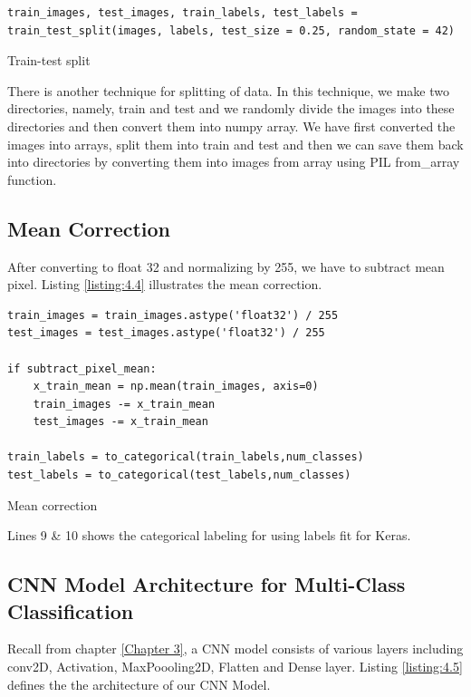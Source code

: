 \begin{listing}[H]
    \begin{verbatim}
train_images, test_images, train_labels, test_labels = 
train_test_split(images, labels, test_size = 0.25, random_state = 42)
\end{verbatim}
\caption{Train-test split}
\label{listing:4.3}
\end{listing}
There is another technique for splitting of data. In this technique, we make two directories,
namely, train and test and we randomly divide the images into these directories and then
convert them into numpy array. We have first converted the images
into arrays, split them into train and test and then we can save them back into
directories by converting them into images from array using PIL from\_array
function.

\subsection{Mean Correction}
After converting to float 32 and normalizing by 255, we have to subtract mean pixel.
Listing \ref{listing:4.4} illustrates the mean correction.

\begin{listing}[H]
    \begin{verbatim}
train_images = train_images.astype('float32') / 255
test_images = test_images.astype('float32') / 255

if subtract_pixel_mean:
    x_train_mean = np.mean(train_images, axis=0)
    train_images -= x_train_mean
    test_images -= x_train_mean

train_labels = to_categorical(train_labels,num_classes)
test_labels = to_categorical(test_labels,num_classes)
    \end{verbatim}
    \caption{Mean correction}
\label{listing:4.4}
\end{listing}
\noindent Lines 9 \& 10 shows the categorical labeling for using labels fit for Keras.
\subsection{CNN Model Architecture for Multi-Class Classification}
Recall from chapter \ref{Chapter 3}, a CNN model consists of various layers including
conv2D, Activation, MaxPoooling2D, Flatten and Dense layer. Listing \ref{listing:4.5}
defines the the architecture of our CNN Model.


